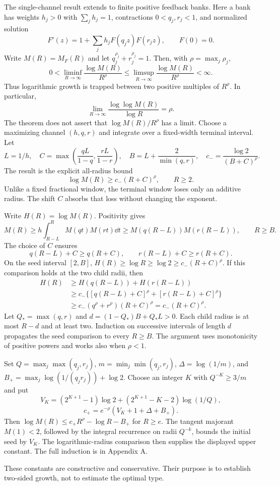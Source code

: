 The single-channel result extends to finite positive feedback banks. Here a
bank has weights $h_j>0$ with $\sum_jh_j=1$, contractions
$0<q_j,r_j<1$, and normalized solution
\[
F'(z)=1+\sum_jh_jF(q_jz)F(r_jz),\qquad F(0)=0.
\]
Write $M(R)=M_F(R)$ and let $q_j^{\rho_j}+r_j^{\rho_j}=1$.
Then, with $\rho=\max_j\rho_j$,
\[
\boxed{0<\liminf_{R\to\infty}\frac{\log M(R)}{R^\rho}
\le\limsup_{R\to\infty}\frac{\log M(R)}{R^\rho}<\infty.}
\]
Thus logarithmic growth is trapped between two positive multiples of
$R^\rho$. In particular,
\[
\lim_{R\to\infty}\frac{\log\log M(R)}{\log R}=\rho.
\]
The theorem does not assert that $\log M(R)/R^\rho$ has a limit.
Choose a maximizing channel $(h,q,r)$ and integrate over a fixed-width
terminal interval. Let
\[
L=1/h,\quad C=\max\left(\frac{qL}{1-q},\frac{rL}{1-r}\right),\quad
B=L+\frac{2}{\min(q,r)},\quad c_-=\frac{\log2}{(B+C)^\rho}.
\]
The result is the explicit all-radius bound
\[
\log M(R)\ge c_-(R+C)^\rho,\qquad R\ge2.
\]
Unlike a fixed fractional window, the terminal window loses only an additive
radius. The shift $C$ absorbs that loss without changing the exponent.

Write $H(R)=\log M(R)$. Positivity gives
\[
M(R)\ge h\int_{R-L}^{R}M(qt)M(rt)\dd t
\ge M(q(R-L))M(r(R-L)),\qquad R\ge B.
\]
The choice of $C$ ensures
\[
q(R-L)+C\ge q(R+C),\qquad r(R-L)+C\ge r(R+C).
\]
On the seed interval $[2,B]$, $H(R)\ge\log R\ge\log2\ge c_-(R+C)^\rho$.
If this comparison holds at the two child radii, then
\[
\begin{aligned}
H(R)&\ge H(q(R-L))+H(r(R-L))\\
&\ge c_-\{[q(R-L)+C]^\rho+[r(R-L)+C]^\rho\}\\
&\ge c_-(q^\rho+r^\rho)(R+C)^\rho=c_-(R+C)^\rho.
\end{aligned}
\]
Let $Q_* =\max(q,r)$ and $d=(1-Q_*)B+Q_*L>0$. Each child radius is at
most $R-d$ and at least two. Induction on successive intervals of length
$d$ propagates the seed comparison to every $R\ge B$. The argument uses
monotonicity of positive powers and works also when $\rho<1$.

Set $Q=\max_j\max(q_j,r_j)$, $m=\min_j\min(q_j,r_j)$,
$\Delta=\log(1/m)$, and $B_+=\max_j\log(1/(q_jr_j))+\log2$.
Choose an integer $K$ with $Q^{-K}\ge3/m$ and put
\[
V_K=(2^{K+1}-1)\log2+(2^{K+1}-K-2)\log(1/Q),
\]
\[
c_+=e^{-\rho}(V_K+1+\Delta+B_+).
\]
Then $\log M(R)\le c_+R^\rho-\log R-B_+$ for $R\ge e$.
The tangent majorant $M(1)<2$, followed by the integral recurrence on radii
$Q^{-k}$, bounds the initial seed by $V_K$. The logarithmic-radius comparison
then supplies the displayed upper constant. The full induction is in Appendix A.

These constants are constructive and conservative. Their purpose is to
establish two-sided growth, not to estimate the optimal type.
